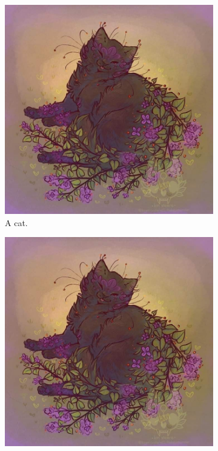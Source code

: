 \documentclass{article}
\begin{document}
\begin{figure}[h!]
  \centering
  \begin{subfigure}[b]{0.2\linewidth}
    \includegraphics[width=\linewidth]{cat.jpg}
     \caption{A cat.}
  \end{subfigure}
  \begin{subfigure}[b]{0.2\linewidth}
    \includegraphics[width=\linewidth]{cat.jpg}

\end{subfigure}
\end{figure}
\end{document}
